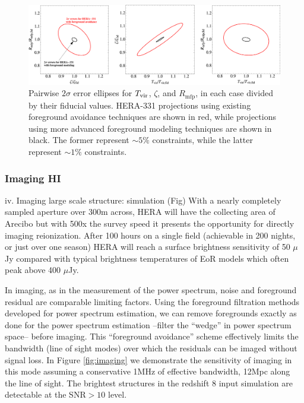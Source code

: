 \documentclass[preprint]{aastex}
\begin{document}
\begin{figure}[t]\centering
\includegraphics[width=\textwidth]{plots/Pspec/OPTMIDellipses.pdf}
\caption{Pairwise $2\sigma$ error ellipses for $T_{\rm vir}$, $\zeta$, and $R_\textrm{mfp}$, in each case divided by their fiducial values.  HERA-331 projections using existing foreground avoidance techniques are shown in red, while projections using more advanced foreground modeling techniques are shown in black.  The former represent $\sim 5\%$ constraints, while the latter represent $\sim 1\%$ constraints.\label{fig:ErrorEllipses}}
\end{figure}


\subsubsection{Imaging HI}
iv. Imaging large scale structure: simulation (Fig) 
With a nearly completely sampled aperture over 300m across, HERA will have the collecting area of Arecibo but with 500x the survey speed it presents the opportunity for directly imaging reionization.  After 100 hours on a single field (achievable in 200 nights, or just over one season) HERA will reach a surface brightness sensitivity of 50 $\mu$Jy compared with typical brightness temperatures of EoR models which often peak above 400 $\mu$Jy.

In imaging, as in the measurement of the power spectrum, noise and foreground residual are comparable limiting factors. Using the foreground filtration methods developed for power spectrum estimation, we can remove foregrounds exactly as done for the power spectrum estimation --filter the ``wedge'' in power spectrum space-- before imaging.  This ``foreground avoidance'' scheme effectively limits the bandwidth (line of sight modes) over which the residuals can be imaged without signal loss.  In Figure \ref{fig:imaging} we demonstrate the sensitivity of imaging in this mode assuming a conservative 1MHz of effective bandwidth, 12Mpc along the line of sight.  The brightest structures in the redshift 8 input simulation are detectable at the SNR$>10$ level.
\end{document}
